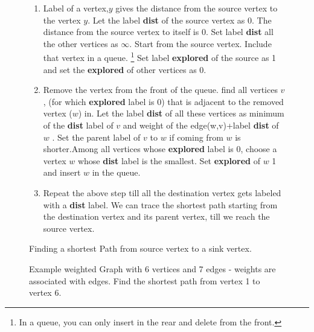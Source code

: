 \begin{figure} 
\begin{enumerate}
\item  Label of a vertex,$y$ gives the distance from the source vertex to the vertex $y$.  Let the label \textbf{dist} of the source vertex as 0. The distance from the source vertex to itself is 0. Set label \textbf{dist} all the other vertices as $\infty$. Start from the source vertex. Include that vertex in a queue. \footnote{ In a queue, you can only insert in the rear and delete from the front.} Set label \textbf{explored} of the source as 1 and set the \textbf{explored} of other vertices as 0.
\item Remove the vertex from the front of the queue. find all vertices $v$, (for which \textbf{explored} label is 0) that is adjacent to the removed vertex ($w$) in. Let the label \textbf{dist} of all these vertices as minimum of the \textbf{dist} label of $v$ and weight of the edge(w,v)+label \textbf{dist} of $w$ .  Set the parent label of $v$ to $w$ if coming from $w$ is shorter.Among all vertices whose \textbf{explored} label is 0, choose a vertex $w$ whose \textbf{dist} label is the smallest. Set \textbf{explored} of $w$ 1 and insert $w$ in the queue.
\item Repeat the above step till all the destination vertex gets labeled with a \textbf{dist} label. We can trace the shortest path starting from the destination vertex and its parent vertex, till we reach the source vertex.
\end{enumerate}
\caption{Finding a shortest Path from source vertex to a sink vertex.}\label{12a2}
\end{figure}

\begin{figure}
\begin{center}
\caption{ Example weighted Graph with 6 vertices and 7 edges - weights are associated with edges. Find the shortest path from vertex 1 to vertex 6.}\label{12g8}
\end{center}
\end{figure}

